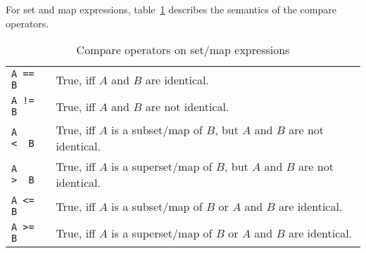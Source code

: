 For set and map expressions, table~\ref{compandsetmap} describes the semantics of the compare operators.
\begin{table}[htbp]
  \centering
  \begin{tabularx}{\linewidth}{|l|X|} \hline
    \texttt{A == B} & True, iff $A$ and $B$ are identical. \\
    \texttt{A != B} & True, iff $A$ and $B$ are not identical. \\
    \texttt{A <\ \ B} & True, iff $A$ is a subset/map of $B$, but $A$ and $B$ are not identical. \\
    \texttt{A >\ \ B} & True, iff $A$ is a superset/map of $B$, but $A$ and $B$ are not identical. \\
    \texttt{A <= B} & True, iff $A$ is a subset/map of $B$ or $A$ and $B$ are identical. \\
    \texttt{A >= B} & True, iff $A$ is a superset/map of $B$ or $A$ and $B$ are identical. \\ \hline
  \end{tabularx}
  \caption{Compare operators on set/map expressions}
  \label{compandsetmap}
\end{table}

